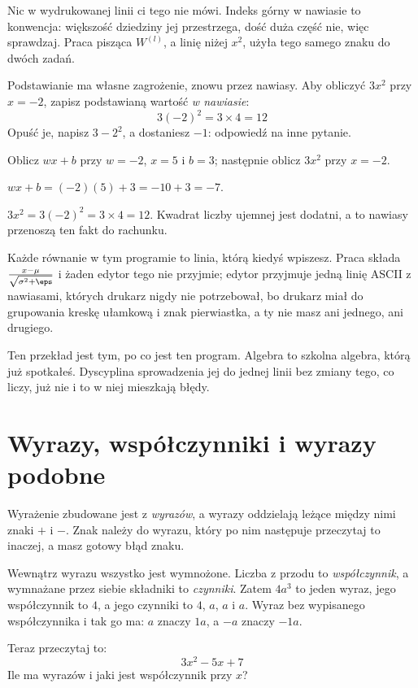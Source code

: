 \begin{fr}
Nic w wydrukowanej linii ci tego nie mówi. Indeks górny w nawiasie to
konwencja: większość dziedziny jej przestrzega, dość duża część nie, więc
sprawdzaj. Praca pisząca $W^{(l)}$, a linię niżej $x^{2}$, użyła tego samego
znaku do dwóch zadań.

Podstawianie ma własne zagrożenie, znowu przez nawiasy. Aby obliczyć
$3x^{2}$ przy $x = -2$, zapisz podstawianą wartość \emph{w nawiasie}:
\[ 3(-2)^{2} = 3 \times 4 = 12 \]
Opuść je, napisz $3-2^{2}$, a dostaniesz $-1$: odpowiedź na inne pytanie.

\yourturn
Oblicz $wx + b$ przy $w = -2$, $x = 5$ i $b = 3$; następnie oblicz $3x^{2}$
przy $x = -2$.
\dotline
\nextframe
\end{fr}

\begin{fr}
\begin{ansblock}
$wx + b = (-2)(5) + 3 = -10 + 3 = -7$.

$3x^{2} = 3(-2)^{2} = 3 \times 4 = 12$. Kwadrat liczby ujemnej jest dodatni, a
to nawiasy przenoszą ten fakt do rachunku.
\end{ansblock}

\begin{aibox}
Każde równanie w tym programie to linia, którą kiedyś wpiszesz. Praca składa
$\frac{x - \mu}{\sqrt{\sigma^{2} + \eps}}$ i żaden edytor tego nie przyjmie;
edytor przyjmuje jedną linię ASCII z nawiasami, których drukarz nigdy nie
potrzebował, bo drukarz miał do grupowania kreskę ułamkową i znak pierwiastka,
a ty nie masz ani jednego, ani drugiego.

Ten przekład jest tym, po co jest ten program. Algebra to szkolna algebra,
którą już spotkałeś. Dyscyplina sprowadzenia jej do jednej linii bez zmiany
tego, co liczy, już nie \dash{} i to w niej mieszkają błędy.
\end{aibox}
\end{fr}

\section{Wyrazy, współczynniki i wyrazy podobne}
\label{sec:F02-terms}

\begin{fr}
Wyrażenie zbudowane jest z \emph{wyrazów}, a wyrazy oddzielają leżące między
nimi znaki $+$ i $-$. Znak należy do wyrazu, który po nim następuje \dash{}
przeczytaj to inaczej, a masz gotowy błąd znaku.

Wewnątrz wyrazu wszystko jest wymnożone. Liczba z przodu to
\emph{współczynnik}, a wymnażane przez siebie składniki to \emph{czynniki}.
Zatem $4a^{3}$ to jeden wyraz, jego współczynnik to $4$, a jego czynniki to
$4$, $a$, $a$ i $a$. Wyraz bez wypisanego współczynnika i tak go ma: $a$
znaczy $1a$, a $-a$ znaczy $-1a$.

Teraz przeczytaj to:
\[ 3x^{2} - 5x + 7 \]
Ile ma wyrazów i jaki jest współczynnik przy $x$?
\nextframe
\end{fr}

